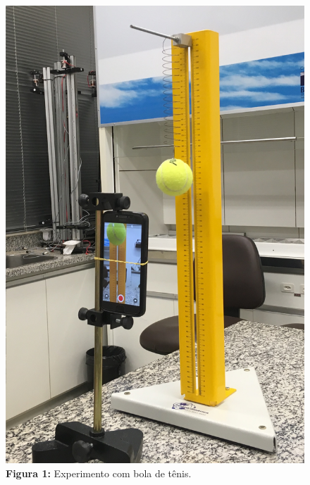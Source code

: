 \documentclass[a4paper, 12pt]{article}
\begin{document}
\begin{multicols}{2}
\begin{figure}[H]
				\includegraphics[scale=0.09]{./img/bolaTenis.jpg}
				\captionsetup{labelformat=empty}
				\caption{\textbf{Figura 1:} Experimento com bola de tênis.}
			\end{figure}
			\begin{figure}[H] \label{img:metal}
				\centering

\end{figure}
\end{multicols}
\end{document}
